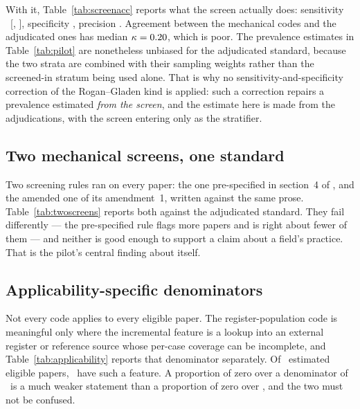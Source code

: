 With it, Table~\ref{tab:screenacc} reports what the screen actually does:
sensitivity \auditSens\ [\auditSensLo, \auditSensHi], specificity
\auditSpec, precision \auditPrec. Agreement between the mechanical codes and
the adjudicated ones has median $\kappa = 0.20$, which is poor. The
prevalence estimates in Table~\ref{tab:pilot} are nonetheless unbiased for the
adjudicated standard, because the two strata are combined with their sampling
weights rather than the screened-in stratum being used alone. That is why no
sensitivity-and-specificity correction of the Rogan--Gladen \citeyearpar{rogan1978estimating} kind
is applied: such a correction repairs a prevalence estimated \emph{from the
screen}, and the estimate here is made from the adjudications, with the screen
entering only as the stratifier.

\subsection*{Two mechanical screens, one standard}



Two screening rules ran on every paper: the one pre-specified in
section~4 of \firstpilotprotocolfile, and the amended one of its
amendment~1, written against the same prose. Table~\ref{tab:twoscreens}
reports both against the adjudicated standard. They fail differently --- the
pre-specified rule flags more papers and is right about fewer of them --- and
neither is good enough to support a claim about a field's practice. That is
the pilot's central finding about itself.

\subsection*{Applicability-specific denominators}



Not every code applies to every eligible paper. The register-population code
is meaningful only where the incremental feature is a lookup into an external
register or reference source whose per-case coverage can be incomplete, and
Table~\ref{tab:applicability} reports that denominator separately. Of
\nAuditEligible\ estimated eligible papers, \nAuditApplicable\ have such a
feature. A proportion of zero over a denominator of \nAuditApplicable\ is a
much weaker statement than a proportion of zero over \nAuditEligible, and the
two must not be confused.

